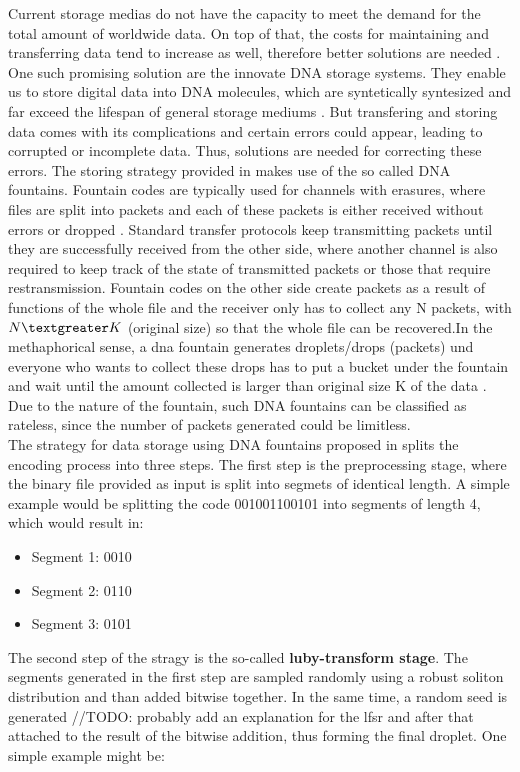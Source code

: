 \documentclass[12pt]%
{article}
\begin{document}
Current storage medias do not have the capacity to meet the demand for the total amount of worldwide data. On top of that, the costs for maintaining and transferring data tend to increase as well, therefore better solutions are needed \cite{dong2020dna}. One such promising solution are the innovate DNA storage systems. They enable us to store digital data into DNA molecules, which are syntetically syntesized and far exceed the lifespan of general storage mediums \cite{dong2020dna}. But transfering and storing data comes with its complications and certain errors could appear, leading to corrupted or incomplete data. Thus, solutions are needed for correcting these errors. The storing strategy provided in \cite{erlich2017dna} makes use of the so called DNA fountains. Fountain codes are typically used for channels with erasures, where files are split into packets and each of these packets is either received without errors or dropped \cite{mackay2005fountain}.  Standard transfer protocols keep transmitting packets until they are successfully received from the other side, where another channel is also required to keep track of the state of transmitted packets or those that require restransmission. Fountain codes on the other side create packets as a result of functions of the whole file and the receiver only has to collect any N packets, with $N \textgreater K$ (original size) so that the whole file can be recovered.In the methaphorical sense, a dna fountain generates droplets/drops (packets) und everyone who wants to collect these drops has to put a bucket under the fountain and wait until the amount collected is larger than original size K of the data \cite{mackay2005fountain}. Due to the nature of the fountain, such DNA fountains can be classified as rateless, since the number of packets generated could be limitless. \\
The strategy for data storage using DNA fountains proposed in \cite{erlich2017dna} splits the encoding process into three steps. The first step is the preprocessing stage, where the binary file provided as input is split into segmets of identical length. A simple example would be splitting the code 001001100101 into segments of length 4, which would result in:
\begin{itemize}
\item Segment 1: 0010
\item Segment 2: 0110
\item Segment 3: 0101
\end{itemize}

The second step of the stragy is the so-called \textbf{luby-transform stage}. The segments generated  in the first step are sampled randomly using a robust soliton distribution \cite{yao2016poisson} and than added bitwise together. In the same time, a random seed is generated //TODO: probably add an explanation for the lfsr and after that attached to the result of the bitwise addition, thus forming the final droplet. One simple example might be:
\end{document}
